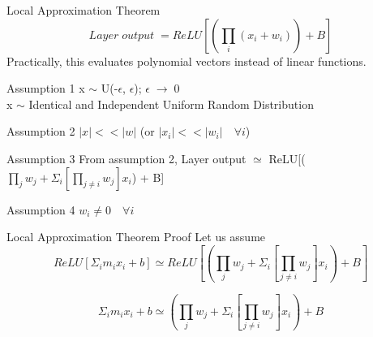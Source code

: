 \documentclass{article}
\begin{document}
	\begin{section}{Local Approximation Theorem}
		\begin{equation}
			Layer \; output \; = ReLU[(\prod_i(x_i + w_i)) + B]
		\end{equation}
		Practically, this evaluates polynomial vectors instead of linear functions.
		
		\begin{subsection}{Assumption 1}
			x $\sim$ U(-$\epsilon$, $\epsilon$); $\epsilon \; \rightarrow \; 0$\\
			x $\sim$ Identical and Independent Uniform Random Distribution
		\end{subsection}
		
		\begin{subsection}{Assumption 2}
			$|x| << |w|$ (or $|x_i| << |w_i| \quad \forall i$)
		\end{subsection}
		
		\begin{subsection}{Assumption 3}
			From assumption 2,
			Layer output $\simeq$ ReLU[($\prod_j w_j + \Sigma_i [\prod_{j \ne i} w_j] x_i$) + B]
		\end{subsection}

		\begin{subsection}{Assumption 4}
			$w_i \ne 0 \quad \forall i$
		\end{subsection}

		\begin{subsection}{Local Approximation Theorem Proof}
			Let us assume
			\begin{equation}
				ReLU[\Sigma_i m_i x_i + b] \simeq ReLU[(\prod_j w_j + \Sigma_i[\prod_{j \ne i} w_j]x_i) + B]
			\end{equation}
			
			\begin{equation}
				\Sigma_i m_i x_i + b \simeq (\prod_j w_j + \Sigma_i[\prod_{j \ne i} w_j]x_i) + B
			\end{equation}
			
		\end{subsection}
	\end{section}
	
\end{document}
